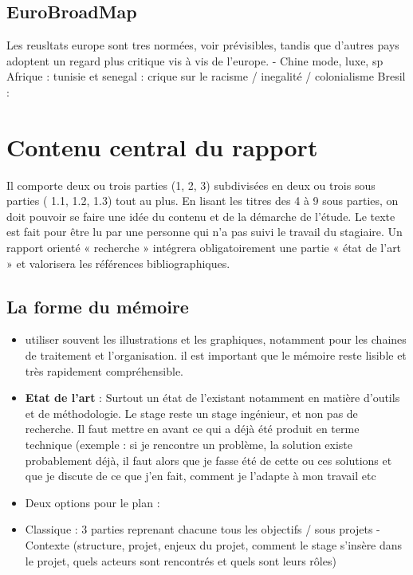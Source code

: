 \documentclass[
  a4paper,
]{scrbook}
\begin{document}
\hypertarget{eurobroadmap}{%
\section{EuroBroadMap}\label{eurobroadmap}}

Les reusltats europe sont tres normées, voir prévisibles, tandis que
d'autres pays adoptent un regard plus critique vis à vis de l'europe. -
Chine mode, luxe, sp Afrique : tunisie et senegal : crique sur le
racisme / inegalité / colonialisme Bresil :

\hypertarget{contenu-central-du-rapport}{%
\chapter{Contenu central du rapport}\label{contenu-central-du-rapport}}

Il comporte deux ou trois parties (1, 2, 3) subdivisées en deux ou trois
sous parties ( 1.1, 1.2, 1.3) tout au plus. En lisant les titres des 4 à
9 sous parties, on doit pouvoir se faire une idée du contenu et de la
démarche de l'étude. Le texte est fait pour être lu par une personne qui
n'a pas suivi le travail du stagiaire. Un rapport orienté « recherche »
intégrera obligatoirement une partie « état de l'art » et valorisera les
références bibliographiques.

\hypertarget{la-forme-du-muxe9moire}{%
\section{La forme du mémoire}\label{la-forme-du-muxe9moire}}

\begin{itemize}
\item
  utiliser souvent les illustrations et les graphiques, notamment pour
  les chaines de traitement et l'organisation. il est important que le
  mémoire reste lisible et très rapidement compréhensible.
\item
  \textbf{Etat de l'art} : Surtout un état de l'existant notamment en
  matière d'outils et de méthodologie. Le stage reste un stage
  ingénieur, et non pas de recherche. Il faut mettre en avant ce qui a
  déjà été produit en terme technique (exemple : si je rencontre un
  problème, la solution existe probablement déjà, il faut alors que je
  fasse été de cette ou ces solutions et que je discute de ce que j'en
  fait, comment je l'adapte à mon travail etc
\item
  Deux options pour le plan :
\item
  Classique : 3 parties reprenant chacune tous les objectifs / sous
  projets - Contexte (structure, projet, enjeux du projet, comment le
  stage s'insère dans le projet, quels acteurs sont rencontrés et quels
  sont leurs rôles)
\end{itemize}
\end{document}
